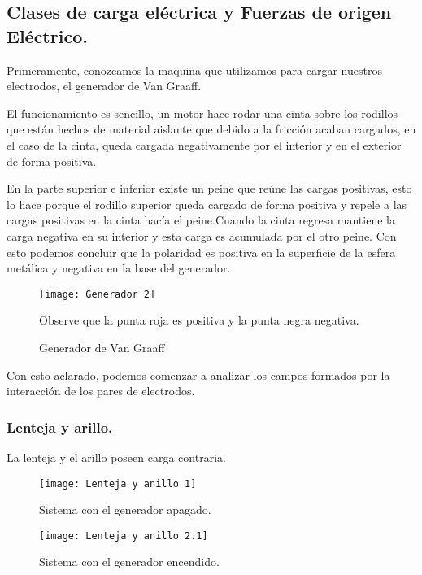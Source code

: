 \documentclass[spanish,10pt,a4paper,onecolumn]{article}
\begin{document}
\subsection{Clases de carga eléctrica y Fuerzas de origen Eléctrico.}

Primeramente, conozcamos la maquina que utilizamos para cargar nuestros electrodos, el generador de Van Graaff.

El funcionamiento es sencillo, un motor hace rodar una cinta sobre los rodillos que están hechos de material aislante que debido a la fricción acaban cargados, en el caso de la cinta, queda cargada negativamente por el interior y en el exterior de forma positiva.

En la parte superior e inferior existe un peine que reúne las cargas positivas, esto lo hace porque el rodillo superior queda cargado de forma positiva y repele a las cargas positivas en la cinta hacía el peine.Cuando la cinta regresa mantiene la carga negativa en su interior y esta carga es acumulada por el otro peine. Con esto podemos concluir que la polaridad es positiva en la superficie de la esfera metálica y negativa en la base del generador.

\begin{figure}[h!]
	\centering
	\texttt{[image: Generador 2]}
	\caption{Generador de Van Graaff}
	\label{fig:Generador}
	Observe que la punta roja es positiva y la punta negra negativa.
\end{figure}

Con esto aclarado, podemos comenzar a analizar los campos formados por la interacción de los pares de electrodos.

\newpage
\subsubsection{Lenteja y arillo.}



La lenteja y el arillo poseen carga contraria.

\begin{figure}[h!]
	\centering
	\texttt{[image: Lenteja y anillo 1]}
	\caption{Sistema con el generador apagado.}
	\label{fig:AyLO}
\end{figure}

\begin{figure}[h!]
	\centering
	\texttt{[image: Lenteja y anillo 2.1]}
	\caption{Sistema con el generador encendido.}
	\label{fig:AyLE1}
\end{figure}
\end{document}
